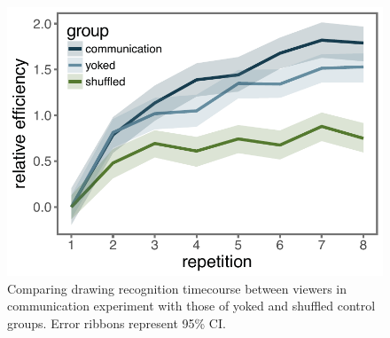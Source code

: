 \documentclass[10pt,letterpaper]{article}
\begin{document}






\begin{figure}
\begin{center}
\includegraphics[width=0.9\linewidth]{figures/recog_BIS_timeseries.pdf}
\caption{Comparing drawing recognition timecourse between viewers in communication experiment with those of yoked and shuffled control groups. Error ribbons represent 95\% CI.}
\label{recog_bis}
\end{center}
\end{figure}
\end{document}
